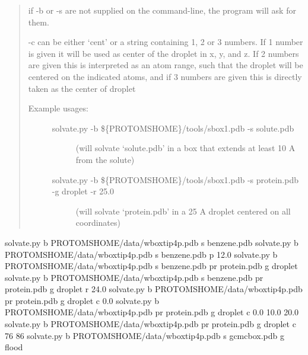 \documentclass[letterpaper,10pt,english]{sphinxmanual}
\begin{document}
\begin{quote}

if -b or -s are not supplied on the command-line, the program will ask for them.

-c can be either ‘cent’ or a string containing 1, 2 or 3 numbers. If 1 number is
given it will be used as center of the droplet in x, y, and z. If 2 numbers are 
given this is interpreted as an atom range, such that the droplet will be centered 
on the indicated atoms, and if 3 numbers are given this is directly taken as the
center of droplet
\begin{description}
\item[{Example usages:}] \leavevmode\begin{description}
\item[{solvate.py -b \$\{PROTOMSHOME\}/tools/sbox1.pdb -s solute.pdb}] \leavevmode
(will solvate ‘solute.pdb’ in a box that extends at least 10 A from the solute)

\item[{solvate.py -b \$\{PROTOMSHOME\}/tools/sbox1.pdb -s protein.pdb -g droplet -r 25.0}] \leavevmode
(will solvate ‘protein.pdb’ in a 25 A droplet centered on all coordinates)

\end{description}

\end{description}
\end{quote}



%
\begin{sphinxVerbatim}[commandchars=\\\{\}]
solvate.py \PYGZhy{}b \PYGZdl{}PROTOMSHOME/data/wbox\PYGZus{}tip4p.pdb \PYGZhy{}s benzene.pdb
solvate.py \PYGZhy{}b \PYGZdl{}PROTOMSHOME/data/wbox\PYGZus{}tip4p.pdb \PYGZhy{}s benzene.pdb \PYGZhy{}p 12.0
solvate.py \PYGZhy{}b \PYGZdl{}PROTOMSHOME/data/wbox\PYGZus{}tip4p.pdb \PYGZhy{}s benzene.pdb \PYGZhy{}pr protein.pdb \PYGZhy{}g droplet
solvate.py \PYGZhy{}b \PYGZdl{}PROTOMSHOME/data/wbox\PYGZus{}tip4p.pdb \PYGZhy{}s benzene.pdb \PYGZhy{}pr protein.pdb \PYGZhy{}g droplet \PYGZhy{}r 24.0
solvate.py \PYGZhy{}b \PYGZdl{}PROTOMSHOME/data/wbox\PYGZus{}tip4p.pdb \PYGZhy{}pr protein.pdb \PYGZhy{}g droplet \PYGZhy{}c 0.0
solvate.py \PYGZhy{}b \PYGZdl{}PROTOMSHOME/data/wbox\PYGZus{}tip4p.pdb \PYGZhy{}pr protein.pdb \PYGZhy{}g droplet \PYGZhy{}c \PYGZdq{}0.0 10.0 20.0\PYGZdq{}
solvate.py \PYGZhy{}b \PYGZdl{}PROTOMSHOME/data/wbox\PYGZus{}tip4p.pdb \PYGZhy{}pr protein.pdb \PYGZhy{}g droplet \PYGZhy{}c \PYGZdq{}76 86\PYGZdq{}
solvate.py \PYGZhy{}b \PYGZdl{}PROTOMSHOME/data/wbox\PYGZus{}tip4p.pdb \PYGZhy{}s gcmc\PYGZus{}box.pdb \PYGZhy{}g flood
\end{sphinxVerbatim}
\end{document}
